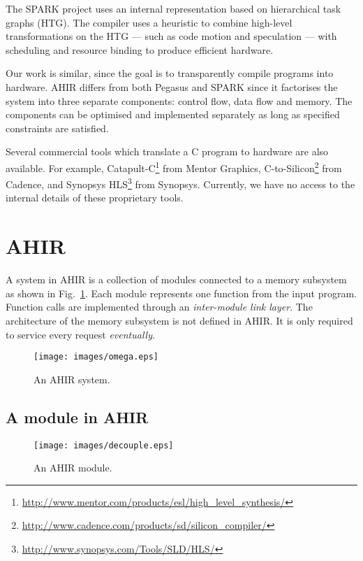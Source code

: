 \documentclass[conference]{IEEEtran}
\begin{document}
The SPARK\cite{spark-vlsi-paper} project uses an internal
representation based on hierarchical task graphs (HTG). The compiler
uses a heuristic to combine high-level transformations on the HTG ---
such as code motion and speculation\cite{spark-code-motion} --- with
scheduling and resource binding to produce efficient hardware.

Our work is similar, since the goal is to transparently compile
programs into hardware. AHIR differs from both Pegasus and SPARK since
it factorises the system into three separate components: control flow,
data flow and memory.  The components can be optimised and
implemented separately as long as specified constraints are satisfied.

Several commercial tools which translate a C program to hardware are
also available. For example,
Catapult-C\footnote{\url{http://www.mentor.com/products/esl/high_level_synthesis/}}
from Mentor Graphics,
C-to-Silicon\footnote{\url{http://www.cadence.com/products/sd/silicon_compiler/}}
from Cadence, and Synopsys
HLS\footnote{\url{http://www.synopsys.com/Tools/SLD/HLS/}} from
Synopsys. Currently, we have no access to the internal details of
these proprietary tools.


\section{AHIR}

A system in AHIR is a collection of modules connected to a memory
subsystem as shown in Fig.~\ref{fig:system}. Each module represents
one function from the input program. Function calls are implemented
through an \emph{inter-module link layer}. The architecture of the
memory subsystem is not defined in AHIR. It is only required to
service every request \emph{eventually}.

\begin{figure}[!t]
  \centering
  \texttt{[image: images/omega.eps]}
  \caption{An AHIR system.}
  \label{fig:system}
\end{figure}

\subsection{A module in AHIR}


\begin{figure}[!t]
  \centering
  \texttt{[image: images/decouple.eps]}
  \caption{An AHIR module.}
  \label{fig:decouple}
\end{figure}
\end{document}
